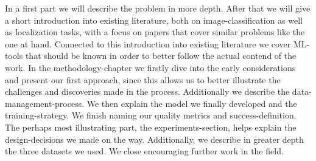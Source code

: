 In a first part we will describe the problem in more depth. After that we will give a short introduction into existing literature, both on image-classification as well as localization tasks, with a focus on papers that cover similar problems like the one at hand. Connected to this introduction into existing literature we cover ML-tools that should be known in order to better follow the actual contend of the work. 
In the methodology-chapter we firstly dive into the early considerations and present our first approach, since this allows us to better illustrate the challenges and discoveries made in the process. Additionally we describe the data-management-process.
We then explain the model we finally developed and the training-strategy. We finish naming our quality metrics and success-definition.
The perhaps most illustrating part, the experiments-section, helps explain the design-decisions we made on the way. Additionally, we describe in greater depth the three datasets we used. We close encouraging further work in the field.